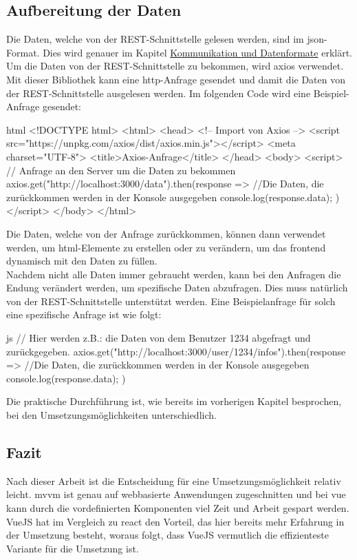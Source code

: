 \subsection{Aufbereitung der Daten}
Die Daten, welche von der REST-Schnittstelle gelesen werden, sind im \Gls{json}-Format. Dies wird genauer im Kapitel \hyperref[sec:json]{Kommunikation und Datenformate} erklärt. Um die Daten von der REST-Schnittstelle zu bekommen, wird \Gls{axios} verwendet. Mit dieser Bibliothek kann eine \Gls{http}-Anfrage gesendet und damit die Daten von der REST-Schnittstelle ausgelesen werden. Im folgenden Code wird eine Beispiel-Anfrage gesendet:
\begin{code}{html}
	<!DOCTYPE html>
	<html>
		<head>
			<!-- Import von Axios -->
			<script src="https://unpkg.com/axios/dist/axios.min.js"></script>
			<meta charset="UTF-8">
			<title>Axios-Anfrage</title>
		</head>
		<body>
			<script>
				// Anfrage an den Server um die Daten zu bekommen
				axios.get("http://localhost:3000/data").then(response => {
					//Die Daten, die zurückkommen werden in der Konsole ausgegeben
					console.log(response.data);
				})
			</script>
		</body>
	</html>
\end{code}
Die Daten, welche von der Anfrage zurückkommen, können dann verwendet werden, um \Gls{html}-Elemente zu erstellen oder zu verändern, um das \Gls{frontend} dynamisch mit den Daten zu füllen.\\Nachdem nicht alle Daten immer gebraucht werden, kann bei den Anfragen die Endung verändert werden, um spezifische Daten abzufragen. Dies muss natürlich von der REST-Schnittstelle unterstützt werden. Eine Beispielanfrage für solch eine spezifische Anfrage ist wie folgt:
\begin{code}{js}
	// Hier werden z.B.: die Daten von dem Benutzer 1234 abgefragt und zurückgegeben.
	axios.get("http://localhost:3000/user/1234/infos").then(response => {
		//Die Daten, die zurückkommen werden in der Konsole ausgegeben
		console.log(response.data);
	})
\end{code}

Die praktische Durchführung ist, wie bereits im vorherigen Kapitel besprochen, bei den Umsetzungsmöglichkeiten unterschiedlich.

\subsection{Fazit}
Nach dieser Arbeit ist die Entscheidung für eine Umsetzungsmöglichkeit relativ leicht. \Gls{mvvm} ist genau auf webbasierte Anwendungen zugeschnitten und bei \Gls{vue} kann durch die vordefinierten Komponenten viel Zeit und Arbeit gespart werden. VueJS hat im Vergleich zu \Gls{react} den Vorteil, das hier bereits mehr Erfahrung in der Umsetzung besteht, woraus folgt, dass VueJS vermutlich die effizienteste Variante für die Umsetzung ist.